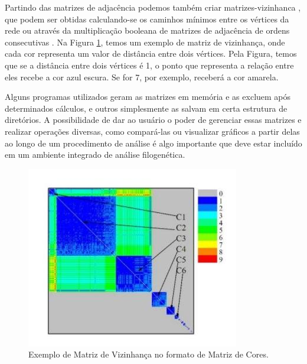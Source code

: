 
Partindo das matrizes de adjacência podemos também criar \gls{matrizes-vizinhanca} \cite{andrade2009}, que podem ser obtidas calculando-se os caminhos mínimos
\cite{bessa2008} entre os vértices da rede ou através da multiplicação booleana de matrizes de adjacência de ordens consecutivas \cite{andrade2006}. Na Figura 
\ref{fig:matriz-vizinhanca}, temos um exemplo de matriz de vizinhança, onde cada cor representa um valor de distância entre dois vértices. Pela Figura, temos
que se a distância entre dois vértices é 1, o ponto que representa a relação entre eles recebe a cor azul escura. Se for 7, por exemplo, receberá a cor
amarela.

Alguns programas utilizados geram as matrizes em memória e as excluem após determinados cálculos, e outros simplesmente as salvam em certa estrutura
de diretórios. A possibilidade de dar ao usuário o poder de gerenciar essas matrizes e realizar operações diversas, como compará-las ou visualizar gráficos
a partir delas ao longo de um procedimento de análise é algo importante que deve estar incluído em um ambiente integrado de análise filogenética.


\begin{figure}
\centering
\includegraphics[scale=0.53]{matriz-vizinhanca}
\caption{Exemplo de Matriz de Vizinhança no formato de Matriz de Cores.}
\label{fig:matriz-vizinhanca}
\end{figure}


